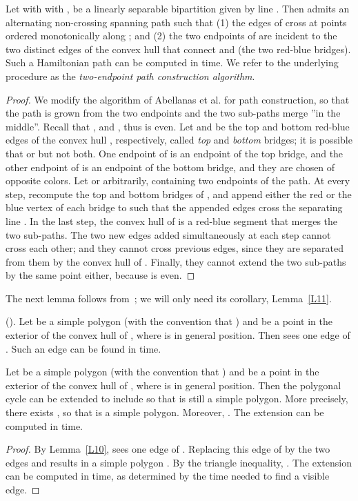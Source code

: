 \documentclass[proceedings]{stacs}
\begin{document}
\begin{lemma}\label{L9}
Let  with with , be a linearly separable bipartition
given by line . Then  admits an alternating non-crossing
spanning path  such that
(1) the edges of  cross  at points ordered monotonically
along ; and (2) the two endpoints of  are incident to the two
distinct edges of the convex hull that connect  and  (the two
red-blue bridges). Such a Hamiltonian path can be computed in  time.
We refer to the underlying procedure as the {\em two-endpoint path
construction algorithm}.
\end{lemma}
\begin{proof}
We modify the algorithm of Abellanas et al. for path construction, so
that the path is grown from the two endpoints and the two sub-paths merge ''in
the middle''.
Recall that  , and , thus  is even.
Let  and  be the top and bottom red-blue edges of
the convex hull , respectively, called {\em top} and {\em bottom}
bridges; it is possible that  or   but not both.
One endpoint of  is an endpoint of the top bridge, and the other
endpoint of  is an endpoint of the bottom bridge, and they are
chosen of opposite colors.
Let  or  arbitrarily,
containing two endpoints of the path. At every step, recompute
the top and bottom bridges of , and append either
the red or the blue vertex of each bridge to  such that the appended
edges cross the separating line . In the last step, the convex hull of
 is a red-blue segment that merges the two sub-paths.
The two new edges added simultaneously at each step
cannot cross each other; and they cannot cross previous edges, since they are
separated from them by the convex hull of . Finally, they cannot
extend the two sub-paths by the same point either, because  is even.
\end{proof}

The next lemma follows from~\cite[Lemma~2.1]{HKRT08}; we will only need its
corollary, Lemma~\ref{L11}.

\begin{lemma} {\rm(\cite{HKRT08}).} \label{L10}
Let  be a simple polygon (with the convention
that ) and  be a point in the exterior of the convex
hull of , where   is in general position. Then 
sees one edge  of . Such an edge can be found in  time.
\end{lemma}


\begin{lemma} \label{L11}
Let  be a simple polygon (with the convention
that ) and  be a point
in the exterior of the convex hull of , where 
is in general position. Then the polygonal cycle
 can be extended to include  so that  is
still a simple polygon. More precisely, there exists , so that
 is a simple polygon.
Moreover, . The extension can be computed in  time.
\end{lemma}
\begin{proof}
By Lemma~\ref{L10},  sees one edge  of .
Replacing this edge of  by the two edges  and 
results in a simple polygon .
By the triangle inequality, .
The extension can be computed in  time, as determined by the
time needed to find a visible edge.
\end{proof}
\end{document}
